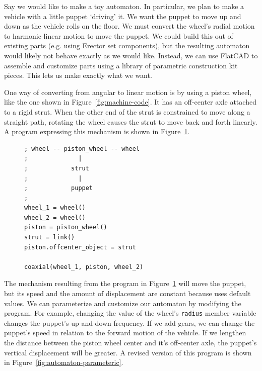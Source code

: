 \documentclass[times, 10pt,twocolumn]{article}
\makeatletter
\newenvironment{subfloat}%
{\def\caption##1{\gdef\subcapsave{\relax##1}}%
\let\subcapsave=\@empty %
\let\sf@oldlabel=\label 
\def\label##1{\xdef\sublabsave{\noexpand\label{##1}}}%
\let\sublabsave\relax %
\setbox\subfigbox\hbox 
\bgroup}%
{\egroup %
\let\label=\sf@oldlabel 
\subfigure[\subcapsave]{\box\subfigbox}}%
\makeatother
\begin{document}
Say we would like to make a toy automaton. In particular, we plan to
make a vehicle with a little puppet `driving' it. We want the puppet
to move up and down as the vehicle rolls on the floor. We must convert
the wheel's radial motion to harmonic linear motion to move the
puppet. We could build this out of existing parts (e.g. using Erector
set components), but the resulting automaton would likely not behave
exactly as we would like. Instead, we can use \nohyphens{FlatCAD} to
assemble and customize parts using a library of parametric
construction kit pieces. This lets us make exactly what we want.

One way of converting from angular to linear motion is by using a
piston wheel, like the one shown in Figure~\ref{fig:machine-code}. It
has an off-center axle attached to a rigid strut. When the other end
of the strut is constrained to move along a straight path, rotating
the wheel causes the strut to move back and forth linearly. A program
expressing this mechanism is shown in Figure~\ref{fig:automaton}.

\begin{figure}
  \begin{subfloat}
    \begin{minipage}{2.6in}
      \small
\begin{verbatim}
; wheel -- piston_wheel -- wheel
;              |
;            strut
;              |
;            puppet
;
wheel_1 = wheel()
wheel_2 = wheel()
piston = piston_wheel()
strut = link()
piston.offcenter_object = strut

coaxial(wheel_1, piston, wheel_2)
\end{verbatim}
    \end{minipage}
  \end{subfloat}
  \caption{A mechanism for a toy automaton using default dimensions
    and angles.}
  \label{fig:automaton}
\end{figure}

The mechanism resulting from the program in Figure~\ref{fig:automaton}
will move the puppet, but its speed and the amount of displacement are
constant because uses default values. We can parameterize and
customize our automaton by modifying the program. For example,
changing the value of the wheel's \textnhtt{radius} member variable
changes the puppet's up-and-down frequency. If we add gears, we can
change the puppet's speed in relation to the forward motion of the
vehicle. If we lengthen the distance between the piston wheel center
and it's off-center axle, the puppet's vertical displacement will be
greater. A revised version of this program is shown in
Figure~\ref{fig:automaton-parameteric}.
\end{document}

